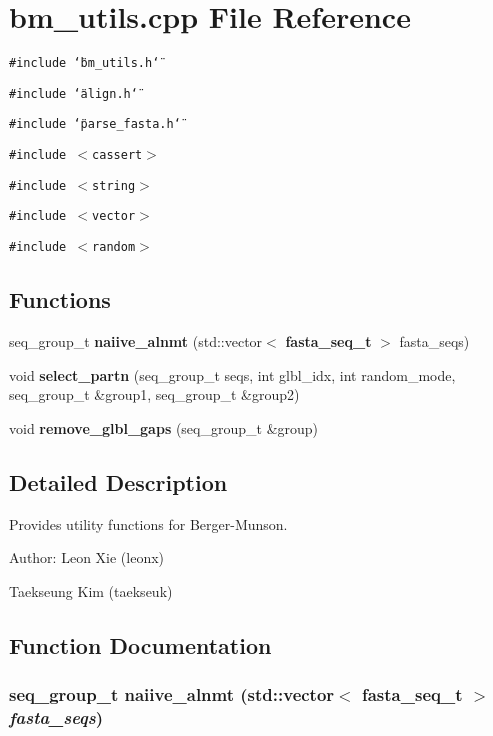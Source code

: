 \section{bm\_\-utils.cpp File Reference}
\label{bm__utils_8cpp}
{\tt \#include \char`\"{}bm\_\-utils.h\char`\"{}}\par
{\tt \#include \char`\"{}align.h\char`\"{}}\par
{\tt \#include \char`\"{}parse\_\-fasta.h\char`\"{}}\par
{\tt \#include $<$cassert$>$}\par
{\tt \#include $<$string$>$}\par
{\tt \#include $<$vector$>$}\par
{\tt \#include $<$random$>$}\par
\subsection*{Functions}
\begin{CompactItemize}
\item 
seq\_\-group\_\-t {\bf naiive\_\-alnmt} (std::vector$<$ {\bf fasta\_\-seq\_\-t} $>$ fasta\_\-seqs)
\item 
void {\bf select\_\-partn} (seq\_\-group\_\-t seqs, int glbl\_\-idx, int random\_\-mode, seq\_\-group\_\-t \&group1, seq\_\-group\_\-t \&group2)
\item 
void {\bf remove\_\-glbl\_\-gaps} (seq\_\-group\_\-t \&group)
\end{CompactItemize}


\subsection{Detailed Description}
Provides utility functions for Berger-Munson. \begin{Desc}
\item[Author:]Leon Xie (leonx) 

Taekseung Kim (taekseuk)\end{Desc}


\subsection{Function Documentation}
\subsubsection{\setlength{\rightskip}{0pt plus 5cm}seq\_\-group\_\-t naiive\_\-alnmt (std::vector$<$ {\bf fasta\_\-seq\_\-t} $>$ {\em fasta\_\-seqs})}\label{bm__utils_8cpp_a0}


